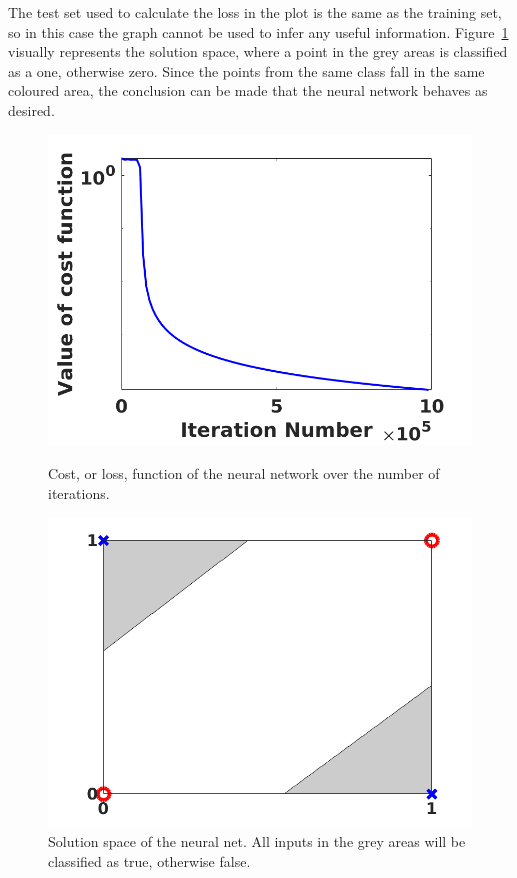 The test set used to calculate the loss in the plot is the same as the training set, so in this case the graph cannot be used to infer any useful information.
Figure~\ref{fig:xor_solved} visually represents the solution space, where a point in the grey areas is classified as a one, otherwise zero.
Since the points from the same class fall in the same coloured area, the conclusion can be made that the neural network behaves as desired.
\begin{figure}[H]
    \centering
    \begin{minipage}{0.45 \textwidth}
        \includegraphics[width = \linewidth]{images/nn/xor_cost.png}
        \caption{Cost, or loss, function of the neural network over the number of iterations.}\label{fig:xor_cost}
    \end{minipage}
    \hspace{2em}
    \begin{minipage}{0.45 \textwidth}
        \includegraphics[width = \linewidth]{images/nn/xor_solved.png}
        \caption{Solution space of the neural net. All inputs in the grey areas will be classified as true, otherwise false.}\label{fig:xor_solved}
    \end{minipage}
\end{figure}

